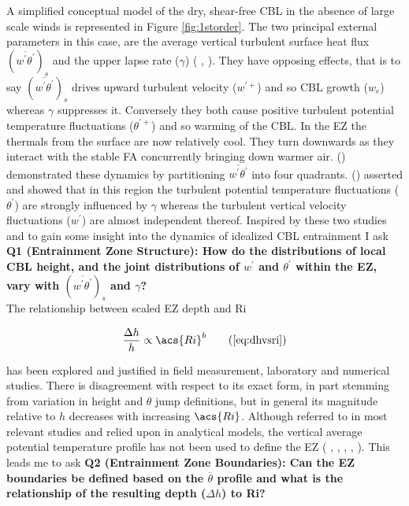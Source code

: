 A simplified conceptual model of the dry, shear-free \acs{CBL} in the absence of large scale winds is represented in Figure \ref{fig:1storder}.  The two principal external parameters in this case, are the average vertical turbulent surface heat flux $(\overline{w^{'}\theta^{'}})_{s}$ and the upper lapse rate ($\gamma$) (\citeauthor{FedConzMir04} \citeyear{FedConzMir04}, \citeauthor{Sorbjan1} \citeyear{Sorbjan1}).  They have opposing effects, that is to say $(\overline{w^{'}\theta^{'}})_{s}$ drives upward turbulent velocity ($w^{'+}$) and so \acs{CBL} growth ($w_{e}$) whereas $\gamma$  suppresses it.  Conversely they both cause positive turbulent potential temperature fluctuations ($\theta^{'+}$) and so warming of the \acs{CBL}.  In the \acs{EZ} the thermals from the surface are now relatively cool.  They turn downwards as they interact with the stable \acs{FA} concurrently bringing down warmer air.  \citeauthor{SullMoengStev} (\citeyear{SullMoengStev}) demonstrated these dynamics by partitioning $\overline{w^{'} \theta^{'}}$ into four quadrants.  \citeauthor{Sorbjan1} (\citeyear{Sorbjan1}) asserted and showed that in this region the turbulent potential temperature fluctuations ($\theta^{'}$) are strongly influenced by $\gamma$ whereas the turbulent vertical velocity fluctuations ($w^{'}$) are almost independent thereof. Inspired by these two studies and to gain some insight into the dynamics of idealized \acs{CBL} entrainment I ask \textbf{Q1 (Entrainment Zone Structure): How do the distributions of local \acs{CBL} height, and the joint distributions of $w^{'}$ and $\theta^{'}$ within the \acs{EZ}, vary with $(\overline{w^{'}\theta^{'}})_{s}$ and $\gamma$?}\\

The relationship between scaled \acs{EZ} depth and \acs{Ri} 

\begin{equation} 
\frac{\Delta h}{h} \propto  \acs{Ri}^{b} \tag{\ref{eq:dhvsri}}
\end{equation}

has been explored and justified in field measurement, laboratory and numerical studies.  There is disagreement with respect to its exact form, in part stemming from variation in height and $\theta$ jump definitions, but in general its magnitude relative to $h$ decreases with increasing $\acs{Ri}$. Although referred to in most relevant studies and relied upon in analytical models, the vertical average potential temperature profile has not been used to define the \acs{EZ} (\citeauthor{DearWill80} \citeyear{DearWill80}, \citeauthor{StullNelEl} \citeyear{StullNelEl}, \citeauthor{FedConzMir04} \citeyear{FedConzMir04}, \citeauthor{Boers89} \citeyear{Boers89}, \citeauthor{BrooksFowler2} \citeyear{BrooksFowler2}). This leads me to ask \textbf{Q2 (Entrainment Zone Boundaries): Can the \acs{EZ} boundaries be defined based on the $\overline{\theta}$ profile and what is the relationship of the resulting depth ($\Delta h$) to \acs{Ri}?}\\


